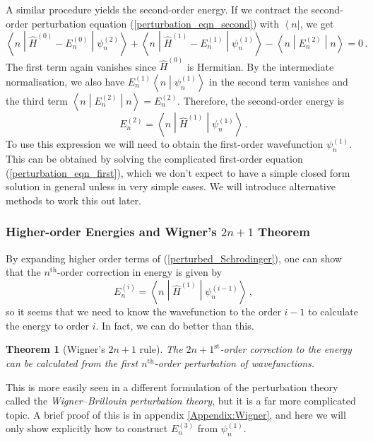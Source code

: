 \documentclass{article}
\theoremstyle{plain}\theoremheaderfont{\normalfont\itshape}\theorembodyfont{\rmfamily}\theoremseparator{.}\newtheorem*{rem}{Remark}\newtheorem*{ex}{Example}\newtheorem*{proof}{Proof}\newtheorem*{altp}{Alternative proof}
\theoremstyle{plain}\theoremheaderfont{\normalfont\bfseries}\theorembodyfont{\rmfamily}\theoremseparator{.}\newtheorem{thm}{Theorem}[section]\newtheorem{lem}[thm]{Lemma}\newtheorem{prop}[thm]{Proposition}\newtheorem*{cor}{Corollary}\newtheorem{defn}[thm]{Definition}\newtheorem{clm}[thm]{Claim}\newtheorem{clminproof}{Claim}
\theoremstyle{break}\theoremheaderfont{\normalfont\itshape}\theorembodyfont{\rmfamily}\theoremseparator{.\medskip}\newtheorem*{proofskip}{Proof}\newtheorem*{exs}{Examples}\newtheorem*{rems}{Remarks}
\theoremstyle{break}\theoremheaderfont{\normalfont\bfseries}\theorembodyfont{\rmfamily}\theoremseparator{.\medskip}\newtheorem{lemskip}[thm]{Lemma}\newtheorem{defnskip}[thm]{Definition}\newtheorem{propskip}[thm]{Proposition}\newtheorem{thmskip}[thm]{Theorem}
\numberwithin{equation}{section}
\newcommand{\bra}[1]{\left\langle #1 \right|}
\newcommand{\braket}[2]{\left\langle #1 \middle| #2 \right\rangle}
\newcommand{\mel}[3]{\left\langle #1 \middle| #2 \middle| #3 \right\rangle}
\newcommand{\expval}[2]{\left\langle #2 \middle| #1 \middle| #2 \right\rangle}
\begin{document}
    A similar procedure yields the second-order energy. If we contract the second-order perturbation equation (\ref{perturbation_eqn_second}) with \(\bra{n}\), we get
    \begin{equation}
        \mel{n}{\hat{H}^{(0)}-E_n^{(0)}}{\psi_n^{(2)}}+\mel{n}{\hat{H}^{(1)}-E_n^{(1)}}{\psi_n^{(1)}}-\expval{E_n^{(2)}}{n}=0\,.
    \end{equation}
    The first term again vanishes since \(\hat{H}^{(0)}\) is Hermitian. By the intermediate normalisation, we also have \(E_n^{(1)}\braket{n}{\psi_n^{(1)}}\) in the second term vanishes and the third term \(\expval{E_n^{(2)}}{n}=E_n^{(2)}\). Therefore, the second-order energy is
    \begin{equation}\label{second_order_energy}
        E_n^{(2)}=\mel{n}{\hat{H}^{(1)}}{\psi_n^{(1)}}\,.
    \end{equation}
    To use this expression we will need to obtain the first-order wavefunction \(\psi_n^{(1)}\). This can be obtained by solving the complicated first-order equation (\ref{perturbation_eqn_first}), which we don't expect to have a simple closed form solution in general unless in very simple cases. We will introduce alternative methods to work this out later.

    \subsubsection{Higher-order Energies and Wigner's \texorpdfstring{\(2n+1\)}{2n+1} Theorem}
    By expanding higher order terms of (\ref{perturbed_Schrodinger}), one can show that the \(n^{\text{th}}\)-order correction in energy is given by
    \begin{equation}\label{ith_order_energy}
        E_n^{(i)}=\mel{n}{\hat{H}^{(1)}}{\psi_n^{(i-1)}}\,,
    \end{equation}
    so it seems that we need to know the wavefunction to the order \(i-1\) to calculate the energy to order \(i\). In fact, we can do better than this.
    \begin{thm}[Wigner's \(2n+1\) rule]
        The \(2n+1^{\text{st}}\)-order correction to the energy can be calculated from the first \(n^{\text{th}}\)-order perturbation of wavefunctions.
    \end{thm}
    This is more easily seen in a different formulation of the perturbation theory called the \textit{Wigner--Brillouin perturbation theory}, but it is a far more complicated topic. A brief proof of this is in appendix \cref{Appendix:Wigner}, and here we will only show explicitly how to construct \(E_n^{(3)}\) from \(\psi_n^{(1)}\).
\end{document}
